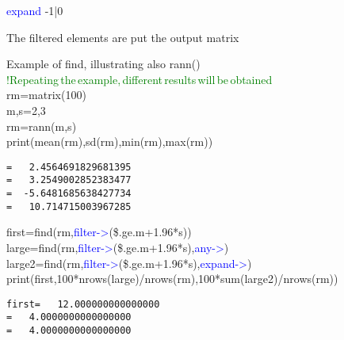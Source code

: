 \vspace{0.3cm}
\hline
\vspace{0.3cm}
\noindent \textcolor{blue}{expand} \tabto{3cm} -1|0 \tabto{5cm}   \tabto{7cm}
\begin{changemargin}{3cm}{0cm}
\noindent  The filtered elements are put the output matrix
\end {changemargin}
\hline
\vspace{0.2cm}
\begin{example}[findex]Example of find, illustrating also \textcolor{VioletRed}{rann}()\\
\label{findex}
\textcolor{green}{!Repeating\,the\,example,\,different\,results\,will\,be\,obtained}\\
rm=\textcolor{VioletRed}{matrix}(100)\\
m,s=2,3\\
rm=\textcolor{VioletRed}{rann}(m,s)\\
\textcolor{VioletRed}{print}(\textcolor{VioletRed}{mean}(rm),\textcolor{VioletRed}{sd}(rm),\textcolor{VioletRed}{min}(rm),\textcolor{VioletRed}{max}(rm))
\color{Green}
\begin{verbatim}
=   2.4564691829681395
=   3.2549002852383477
=  -5.6481685638427734
=   10.714715003967285
\end{verbatim}
\color{Black}
first=\textcolor{VioletRed}{find}(rm,\textcolor{blue}{filter->}(\$.ge.m+1.96*s))\\
large=\textcolor{VioletRed}{find}(rm,\textcolor{blue}{filter->}(\$.ge.m+1.96*s),\textcolor{blue}{any->})\\
large2=\textcolor{VioletRed}{find}(rm,\textcolor{blue}{filter->}(\$.ge.m+1.96*s),\textcolor{blue}{expand->})\\
\textcolor{VioletRed}{print}(first,100*nrows(large)/\textcolor{VioletRed}{nrows}(rm),100*sum(large2)/\textcolor{VioletRed}{nrows}(rm))
\color{Green}
\begin{verbatim}
first=   12.000000000000000
=   4.0000000000000000
=   4.0000000000000000
\end{verbatim}
\color{Black}
\end{example}
